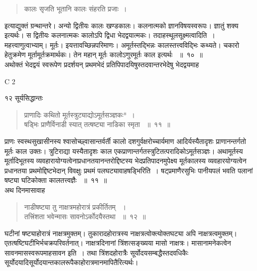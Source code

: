 \documentclass[11pt, openany]{book}
\begin{document}
\begin{quote}
 {\qt कालः सृजति भूतानि कालः संहरति प्रजाः~।}
\end{quote}
\begin{sloppypar}
 इत्याद्युक्तं ग्रन्थान्तरे। अन्यो द्वितीयः कालः खण्डकालः। कलनात्मको ज्ञानविषयस्वरूपः। ज्ञातुं शक्य इत्यर्थः। स द्वितीयः कलनात्मकः कालोऽपि द्विधा भेदद्वयात्मकः। तदाह\textendash स्थूलसूक्ष्मत्वादिति~। महत्त्वाणुत्वाभ्याम्। मूर्तः। इयत्तावच्छिन्नपरिमाणः। अमूर्तस्तद्भिन्नः कालस्तत्त्वविद्भिः कथ्यते। चकारो हेतुक्रमेण मूर्तामूर्तक्रमार्थकः। तेन महान् मूर्तः कालोऽणुरमूर्तः काल इत्यर्थः ~॥~१०~॥\\
 \noindent अथोक्तं भेदद्वयं स्वरूपेण प्रदर्शयन् प्रथमभेदं प्रतिपिपादयिषुस्तदवान्तरभेदेषु भेदद्वयमाह\textendash
\end{sloppypar}

{\tiny{C 2}}


\newpage


\noindent १२ \hspace{4cm} सूर्यसिद्धान्तः
\vspace{1cm}

\begin{quote}
{\ssi प्राणादिः कथितो मूर्तस्त्रुट्याद्योऽमूर्तसञ्ज्ञकः*~।\\
षड्भिः प्राणैर्विनाडी स्यात् तत्षष्ट्या नाडिका स्मृता ~॥~११~॥}
\end{quote}

 प्राणः स्वस्थसुखासीनस्य श्वासोच्छ्वासान्तर्वर्ती कालो दशगुर्वक्षरोच्चार्यमाण आदिर्यस्यैतादृशः प्राणानन्तर्गतो मूर्तः काल उक्तः। त्रुटिराद्या यस्यैतादृशः काल एकप्राणान्तर्गतस्त्रुटितत्परादिकोऽमूर्तसञ्ज्ञः। अथामूर्तस्य मूर्तादिभूतस्य व्यवहारायोग्यत्वेनाप्रधानतयानन्तरोद्दिष्टस्य भेदप्रतिपादनमुपेक्ष्य मूर्तकालस्य व्यवहारयोग्यत्वेन प्रधानतया प्रथमोद्दिष्टभेदान् विवक्षुः प्रथमं पलघट्यावाह\textendash  षड्भिरिति~। षट्प्रमाणैरसुभिः पानीयपलं भवति पलानां षष्ट्या घटिकोक्ता कालतत्त्वज्ञैः ~॥~११~॥\\
 \noindent अथ दिनमासावाह\textendash


\begin{quote}
 {\ssi नाडीषष्ट्या तु नाक्षत्रमहोरात्रं प्रकीर्तितम् ~।\\
तत्त्रिंशता भवेन्मासः सावनोऽर्कोदयैस्तथा ~॥~१२~॥}
\end{quote}
\begin{sloppypar}
 घटीनां षष्ट्याहोरात्रं नाक्षत्रमुक्तम्। तुकारादहोरात्रस्य नाक्षत्रत्वोक्त्योक्तघट्या अपि नाक्षत्रत्वमुक्तम्। एतत्षष्टिघटीभिर्भचक्रपरिवर्तनात्। नाक्षत्रदिनानां त्रिंशत्सङ्ख्यया मासो नाक्षत्रः। मासानामनेकत्वेन सावनमासस्वरूपमाह\textendash सावन इति~। तथा त्रिंशदहोरात्रैः सूर्योदयसम्बद्धैस्तदवधिकैः सूर्योदयादिसूर्योदयान्तकालरूपैकाहोरात्रमानमापितैरित्यर्थः।
\end{sloppypar}
\end{document}
